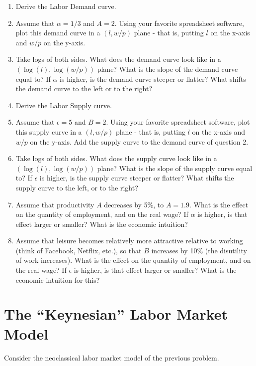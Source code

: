 \documentclass[]{book}
\begin{document}
\begin{enumerate}
\def\labelenumi{\arabic{enumi}.}
\item
  Derive the Labor Demand curve.
\item
  Assume that \(\alpha=1/3\) and \(A=2\). Using your favorite
  spreadsheet software, plot this demand curve in a \((l, w/p)\) plane -
  that is, putting \(l\) on the x-axis and \(w/p\) on the y-axis.
\item
  Take logs of both sides. What does the demand curve look like in a
  \((\log(l), \log(w/p))\) plane? What is the slope of the demand curve
  equal to? If \(\alpha\) is higher, is the demand curve steeper or
  flatter? What shifts the demand curve to the left or to the right?
\item
  Derive the Labor Supply curve.
\item
  Assume that \(\epsilon=5\) and \(B=2\). Using your favorite
  spreadsheet software, plot this supply curve in a \((l, w/p)\) plane -
  that is, putting \(l\) on the x-axis and \(w/p\) on the y-axis. Add
  the supply curve to the demand curve of question 2.
\item
  Take logs of both sides. What does the supply curve look like in a
  \((\log(l), \log(w/p))\) plane? What is the slope of the supply curve
  equal to? If \(\epsilon\) is higher, is the supply curve steeper or
  flatter? What shifts the supply curve to the left, or to the right?
\item
  Assume that productivity \(A\) decreases by 5\%, to \(A=1.9\). What is
  the effect on the quantity of employment, and on the real wage? If
  \(\alpha\) is higher, is that effect larger or smaller? What is the
  economic intuition?
\item
  Assume that leisure becomes relatively more attractive relative to
  working (think of Facebook, Netflix, etc.), so that \(B\) increases by
  10\% (the disutility of work increases). What is the effect on the
  quantity of employment, and on the real wage? If \(\epsilon\) is
  higher, is that effect larger or smaller? What is the economic
  intuition for this?
\end{enumerate}

\section{\texorpdfstring{The ``Keynesian'' Labor Market
Model}{The Keynesian Labor Market Model}}\label{the-keynesian-labor-market-model}

Consider the neoclassical labor market model of the previous problem.
\end{document}
